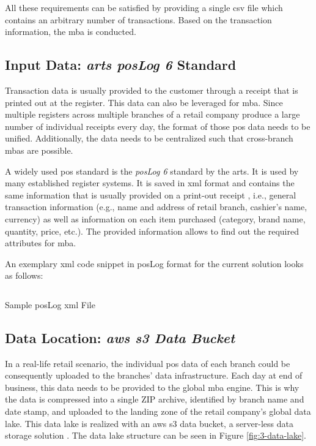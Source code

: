 All these requirements can be satisfied by providing a single \ac{csv} file which contains an arbitrary number of transactions. Based on the transaction information, the \ac{mba} is conducted.


\subsection{Input Data: \textit{\acs{arts} \acs{pos}Log 6} Standard}
Transaction data is usually provided to the customer through a receipt that is printed out at the register. This data can also be leveraged for \ac{mba}. Since multiple registers across multiple branches of a retail company produce a large number of individual receipts every day, the format of those \ac{pos} data needs to be unified. Additionally, the data needs to be centralized such that cross-branch \acp{mba} are possible.

A widely used \ac{pos} standard is the \textit{\ac{pos}Log 6} standard by the \ac{arts}. It is used by many established register systems. It is saved in \ac{xml} format and contains the same information that is usually provided on a print-out receipt \cite{poslog}, i.e., general transaction information (e.g., name and address of retail branch, cashier's name, currency) as well as information on each item purchased (category, brand name, quantity, price, etc.). The provided information allows to find out the required attributes for \ac{mba}.

An exemplary \ac{xml} code snippet in \ac{pos}Log format for the current solution looks as follows:

\begin{longlisting}
	\inputminted{xml}{main-matter/src/3-poslog.xml}
	\caption{Sample \acs{pos}Log \acs{xml} File}
	\label{src:3-poslog}
\end{longlisting}

\subsection{Data Location: \textit{\acs{aws} \acs{s3} Data Bucket}} \label{sec:3-2-data-lake}
In a real-life retail scenario, the individual \ac{pos} data of each branch could be consequently uploaded to the branches' data infrastructure. Each day at end of business, this data needs to be provided to the global \ac{mba} engine. This is why the data is compressed into a single ZIP archive, identified by branch name and date stamp, and uploaded to the landing zone of the retail company's global data lake. This data lake is realized with an \ac{aws} \ac{s3} data bucket, a server-less data storage solution \cite{s3}. The data lake structure can be seen in Figure \ref{fig:3-data-lake}.

